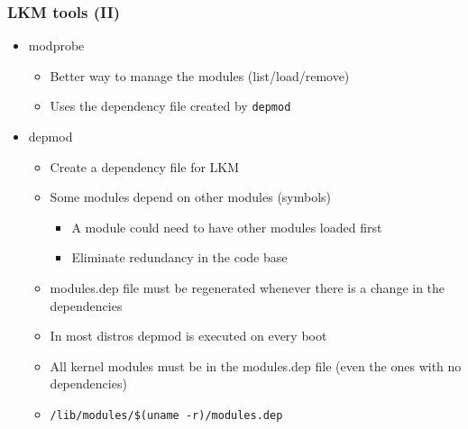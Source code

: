 \documentclass{beamer}
\begin{document}

\begin{frame}
\frametitle{LKM tools (II)}

\begin{itemize}

\item modprobe
   \begin{itemize}
   \item Better way to manage the modules (list/load/remove)
   \item Uses the dependency file created by \texttt{depmod}
   \end{itemize}

\item depmod  
   \begin{itemize}
   \item Create a dependency file for LKM
   \item Some modules depend on other modules (symbols)
     \begin{itemize}
     \item A module could need to have other modules loaded first
     \item Eliminate redundancy in the code base
     \end{itemize}
   \item modules.dep file must be regenerated whenever there is a change in the dependencies
   \item In most distros depmod is executed on every boot
   \item All kernel modules must be in the modules.dep file (even the ones with no dependencies)
   \item \texttt{/lib/modules/\$(uname -r)/modules.dep}
   \end{itemize}

\end{itemize}

\end{frame}

\end{document}
